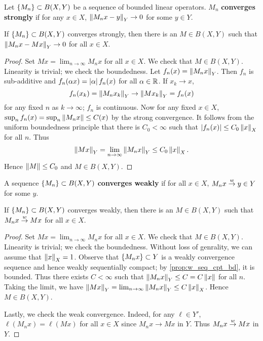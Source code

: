 \begin{definition}
    Let $\left\{ {M_n} \right\}\subset B(X,Y)$ be a sequence of bounded linear operators. $M_n$ 
    \textbf{converges strongly} if for any $x\in X$, $\left\lVert {M_nx - y} \right\rVert_Y\to 0$ for some $y\in Y$.
\end{definition}

\begin{proposition}
    If $\left\{ {M_n} \right\}\subset B(X,Y)$ converges strongly, then there is an $M\in B(X,Y)$ such that
    $\left\lVert {M_nx - Mx} \right\rVert_Y\to 0$ for all $x\in X$. 
\end{proposition}
\begin{proof}
    Set $Mx = \lim_{n\to\infty} M_nx$ for all $x\in X$. We check that $M\in B(X,Y)$. 
    Linearity is trivial; we check the boundedness. Let $f_n(x) = \left\lVert {M_nx} \right\rVert_Y$. 
    Then $f_n$ is sub-additive and $f_n(\alpha x) = \left\lvert {\alpha} \right\rvert f_n(x)$ for all $\alpha\in\mathbb{R}$. 
    If $x_k\to x$, 
    \begin{equation*}
        f_n(x_k) = \left\lVert {M_nx_k} \right\rVert_Y\to\left\lVert {Mx_k} \right\rVert_Y = f_n(x)
    \end{equation*}
    for any fixed $n$ as $k\to\infty$; $f_n$ is continuous. Now for any fixed $x\in X$, 
    $\sup_n f_n(x) = \sup_n \left\lVert {M_nx} \right\rVert\leq C(x)$ by the strong convergence. It follows 
    from the uniform boundedness principle that there is $C_0<\infty$ such that 
    $\left\lvert {f_n(x)} \right\rvert\leq C_0\left\lVert {x} \right\rVert_X$ for all $n$. Thus 
    \begin{equation*}
        \left\lVert {Mx} \right\rVert_Y = \lim_{n\to\infty} \left\lVert {M_nx} \right\rVert_Y \leq C_0\left\lVert {x} \right\rVert_X.
    \end{equation*}
    Hence $\left\lVert {M} \right\rVert\leq C_0$ and $M\in B(X,Y)$.
\end{proof}

\begin{definition}
    A sequence $\left\{ {M_n} \right\}\subset B(X,Y)$ \textbf{converges weakly} if for all 
    $x\in X$, $M_nx\overset{w}{\to} y\in Y$ for some $y$. 
\end{definition}

\begin{proposition}
    If $\left\{ {M_n} \right\}\subset B(X,Y)$ converges weakly, then there is an $M\in B(X,Y)$ such that 
    $M_nx\overset{w}{\to} Mx$ for all $x\in X$.
\end{proposition}
\begin{proof}
    Set $Mx = \lim_{n\to\infty} M_nx$ for all $x\in X$. We check that $M\in B(X,Y)$. 
    Linearity is trivial; we check the boundedness. Without loss of genrality, we can 
    assume that $\left\lVert {x} \right\rVert_X = 1$. Observe that $\left\{ {M_nx} \right\}\subset Y$ 
    is a weakly convergence sequence and hence weakly sequentially compact; by 
    \cref{prop:w_seq_cpt_bd}, it is bounded. Thus there exists $C<\infty$ such that
    $\left\lVert {M_nx} \right\rVert_Y\leq C = C\left\lVert {x} \right\rVert$ for all $n$. Taking the limit, we have 
    $\left\lVert {Mx} \right\rVert_Y = \lim_{n\to\infty} \left\lVert {M_nx} \right\rVert_Y\leq C\left\lVert {x} \right\rVert_X$. Hence $M\in B(X,Y)$.
    
    Lastly, we check the weak convergence. Indeed, for any $\ell\in Y'$, 
    $\ell(M_nx) = \ell(Mx)$ for all $x\in X$ since $M_nx\to Mx$ in $Y$. 
    Thus $M_nx\overset{w}{\to} Mx$ in $Y$. 
\end{proof}

